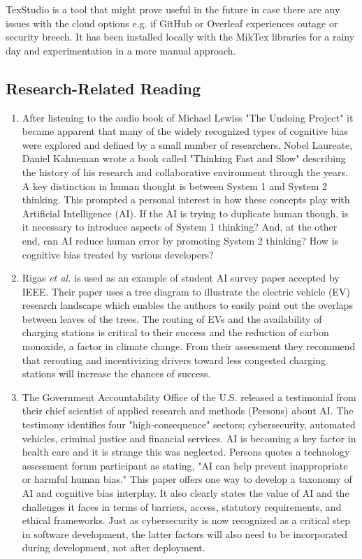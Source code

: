 \documentclass[journal]{IEEEtran}
\begin{document}
TexStudio is a tool that might prove useful in the future in case there are any issues with the cloud options e.g. if GitHub or Overleaf experiences outage or security breech. It has been installed locally with the MikTex libraries for a rainy day and experimentation in a more manual approach.
\subsection{Research-Related Reading}
\begin{enumerate}
    \item After listening to the audio book of Michael Lewis\textquotesingle s "The Undoing Project" it became apparent that many of the widely recognized types of cognitive bias were explored and defined by a small number of researchers. Nobel Laureate, Daniel Kahneman wrote a book called "Thinking Fast and Slow" \cite{KahnemanTFS} describing the history of his research and collaborative environment through the years. A key distinction in human thought is between System 1 and System 2 thinking. This prompted a personal interest in how these concepts play with Artificial Intelligence (AI). If the AI is trying to duplicate human though, is it necessary to introduce aspects of System 1 thinking? And, at the other end, can AI reduce human error by promoting System 2 thinking? How is cognitive bias treated by various developers?
    \item Rigas \textit{et al.} \cite{Rigas} is used as an example of student AI survey paper accepted by IEEE. Their paper uses a tree diagram to illustrate the electric vehicle (EV) research landscape which enables the authors to easily point out the overlaps between leaves of the trees. The routing of EVs and the availability of charging stations is critical to their success and the reduction of carbon monoxide, a factor in climate change. From their assessment they recommend that rerouting and incentivizing drivers toward less congested charging stations will increase the chances of success.
    \item The Government Accountability Office of the U.S. released a testimonial from their chief scientist of applied research and methods (Persons) about AI. The testimony identifies four "high-consequence" sectors; cybersecurity, automated vehicles, criminal justice and financial services. AI is becoming a key factor in health care and it is strange this was neglected. Persons quotes a technology assessment forum participant as stating, "AI can help prevent inappropriate or harmful human bias." \cite{GAO} This paper offers one way to develop a taxonomy of AI and cognitive bias interplay. It also clearly states the value of AI and the challenges it faces in terms of barriers, access, statutory requirements, and ethical frameworks. Just as cybersecurity is now recognized as a critical step in software development, the latter factors will also need to be incorporated during development, not after deployment.

\end{enumerate}
\end{document}

